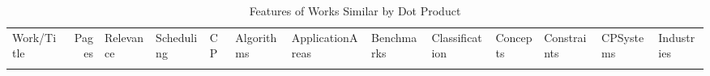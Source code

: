 {\scriptsize
\begin{longtable}{>{\raggedright\arraybackslash}p{3cm}r>{\raggedright\arraybackslash}p{1.0cm}>{\raggedright\arraybackslash}p{ 1.50cm}>{\raggedright\arraybackslash}p{ 1.50cm}>{\raggedright\arraybackslash}p{ 1.50cm}>{\raggedright\arraybackslash}p{ 1.50cm}>{\raggedright\arraybackslash}p{ 1.50cm}>{\raggedright\arraybackslash}p{ 1.50cm}>{\raggedright\arraybackslash}p{ 1.50cm}>{\raggedright\arraybackslash}p{ 1.50cm}>{\raggedright\arraybackslash}p{ 1.50cm}>{\raggedright\arraybackslash}p{ 1.50cm}}
\rowcolor{white}\caption{Features of Works Similar by Dot Product}\\ \toprule
\rowcolor{white}Work/Title & Pages & Relevance & Scheduling& CP& Algorithms& ApplicationAreas& Benchmarks& Classification& Concepts& Constraints& CPSystems& Industries\\ \midrule\endhead
\bottomrule
\endfoot

\end{longtable}}
